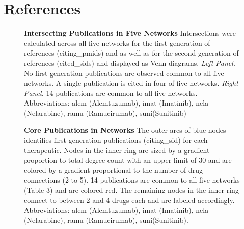 \documentclass[review]{elsarticle}
\begin{document}
\section*{References}



\begin{figure}[!h]
\centering
\scalebox{0.99}
{
\begin{subfigure}{.5\textwidth}
  \centering
  \label{fig:sub1}
\end{subfigure}
\begin{subfigure}{.5\textwidth}
  \centering
  \label{fig:sub2}
\end{subfigure}
}
\caption{{\bf Intersecting Publications in Five Networks} Intersections were calculated across all five networks for the first generation of references (citing\_pmids) and
as well as for the second generation of references (cited\_sids) and displayed as Venn diagrams. \emph{Left Panel.} No first generation publications are observed common to all five networks. A single publication is cited in four of five networks. \emph{Right Panel.} 14  publications are common to all five networks. Abbreviations: alem (Alemtuzumab), imat (Imatinib), nela (Nelarabine), ramu (Ramucirumab), suni(Sunitinib)}
\label{fig: test}
\end{figure}

\begin{figure}[!h]
\centering
\caption{{\bf Core Publications in Networks}  The outer arcs of blue nodes identifies first generation publications (citing\_sid) for each therapeutic. Nodes in the inner ring are sized by a gradient proportion to total degree count with an upper limit of 30 and are colored by a gradient proportional to the number of drug connections (2 to 5). 14  publications are common to all five networks (Table 3) and are colored red. The remaining nodes in the inner ring connect to between 2 and 4 drugs each and are labeled accordingly. Abbreviations: alem (Alemtuzumab), imat (Imatinib), nela (Nelarabine), ramu (Ramucirumab), suni(Sunitinib).}
\label{fig2}
\end{figure}
\end{document}
